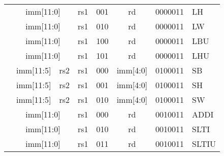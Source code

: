 \begin{table}[p]
\begin{small}
\begin{center}
\begin{tabular}{p{0in}p{0.4in}p{0.05in}p{0.05in}p{0.05in}p{0.05in}p{0.4in}p{0.6in}p{0.4in}p{0.6in}p{0.7in}l}
&
\multicolumn{6}{|c|}{imm[11:0]} &
\multicolumn{1}{c|}{rs1} &
\multicolumn{1}{c|}{001} &
\multicolumn{1}{c|}{rd} &
\multicolumn{1}{c|}{0000011} & LH \\
\cline{2-11}
  

&
\multicolumn{6}{|c|}{imm[11:0]} &
\multicolumn{1}{c|}{rs1} &
\multicolumn{1}{c|}{010} &
\multicolumn{1}{c|}{rd} &
\multicolumn{1}{c|}{0000011} & LW \\
\cline{2-11}
  

&
\multicolumn{6}{|c|}{imm[11:0]} &
\multicolumn{1}{c|}{rs1} &
\multicolumn{1}{c|}{100} &
\multicolumn{1}{c|}{rd} &
\multicolumn{1}{c|}{0000011} & LBU \\
\cline{2-11}
  

&
\multicolumn{6}{|c|}{imm[11:0]} &
\multicolumn{1}{c|}{rs1} &
\multicolumn{1}{c|}{101} &
\multicolumn{1}{c|}{rd} &
\multicolumn{1}{c|}{0000011} & LHU \\
\cline{2-11}
  

&
\multicolumn{4}{|c|}{imm[11:5]} &
\multicolumn{2}{c|}{rs2} &
\multicolumn{1}{c|}{rs1} &
\multicolumn{1}{c|}{000} &
\multicolumn{1}{c|}{imm[4:0]} &
\multicolumn{1}{c|}{0100011} & SB \\
\cline{2-11}
  

&
\multicolumn{4}{|c|}{imm[11:5]} &
\multicolumn{2}{c|}{rs2} &
\multicolumn{1}{c|}{rs1} &
\multicolumn{1}{c|}{001} &
\multicolumn{1}{c|}{imm[4:0]} &
\multicolumn{1}{c|}{0100011} & SH \\
\cline{2-11}
  

&
\multicolumn{4}{|c|}{imm[11:5]} &
\multicolumn{2}{c|}{rs2} &
\multicolumn{1}{c|}{rs1} &
\multicolumn{1}{c|}{010} &
\multicolumn{1}{c|}{imm[4:0]} &
\multicolumn{1}{c|}{0100011} & SW \\
\cline{2-11}
  

&
\multicolumn{6}{|c|}{imm[11:0]} &
\multicolumn{1}{c|}{rs1} &
\multicolumn{1}{c|}{000} &
\multicolumn{1}{c|}{rd} &
\multicolumn{1}{c|}{0010011} & ADDI \\
\cline{2-11}
  

&
\multicolumn{6}{|c|}{imm[11:0]} &
\multicolumn{1}{c|}{rs1} &
\multicolumn{1}{c|}{010} &
\multicolumn{1}{c|}{rd} &
\multicolumn{1}{c|}{0010011} & SLTI \\
\cline{2-11}
  

&
\multicolumn{6}{|c|}{imm[11:0]} &
\multicolumn{1}{c|}{rs1} &
\multicolumn{1}{c|}{011} &
\multicolumn{1}{c|}{rd} &
\multicolumn{1}{c|}{0010011} & SLTIU \\
\cline{2-11}
  


\end{tabular}
\end{center}
\end{small}
\end{table}
